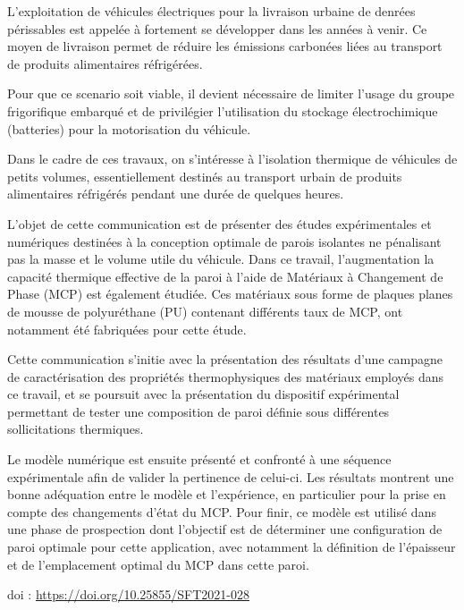{\normalsize
L'exploitation de véhicules électriques pour la livraison urbaine de denrées périssables est appelée à fortement se développer dans les années à venir. Ce moyen de livraison permet de réduire les émissions carbonées liées au transport de produits alimentaires réfrigérées. 



Pour que ce scenario soit viable, il devient nécessaire de limiter l'usage du groupe frigorifique embarqué et de privilégier l'utilisation du stockage électrochimique (batteries) pour la motorisation du véhicule.



Dans le cadre de ces travaux, on s'intéresse à l'isolation thermique de véhicules de petits volumes, essentiellement destinés au transport urbain de produits alimentaires réfrigérés pendant une durée de quelques heures.



L'objet de cette communication est de présenter des études expérimentales et numériques destinées à la conception optimale de parois isolantes ne pénalisant pas la masse et le volume utile du véhicule. Dans ce travail, l'augmentation la capacité thermique effective de la paroi à l'aide de Matériaux à Changement de Phase (MCP) est également étudiée. Ces matériaux sous forme de plaques planes de mousse de polyuréthane (PU) contenant différents taux de MCP, ont notamment été fabriquées pour cette étude.



Cette communication s'initie avec la présentation des résultats d'une campagne de caractérisation des propriétés thermophysiques des matériaux employés dans ce travail, et se poursuit avec la présentation du dispositif expérimental permettant de tester une composition de paroi définie sous différentes sollicitations thermiques.



Le modèle numérique est ensuite présenté et confronté à une séquence expérimentale afin de valider la pertinence de celui-ci. Les résultats montrent une bonne adéquation entre le modèle et l'expérience, en particulier pour la prise en compte des changements d'état du MCP. Pour finir, ce modèle est utilisé dans une phase de prospection dont l'objectif est de déterminer une configuration de paroi optimale pour cette application, avec notamment la définition de l'épaisseur et de l'emplacement optimal du MCP dans cette paroi.

 \vfill doi : \url{https://doi.org/10.25855/SFT2021-028}

}
 
